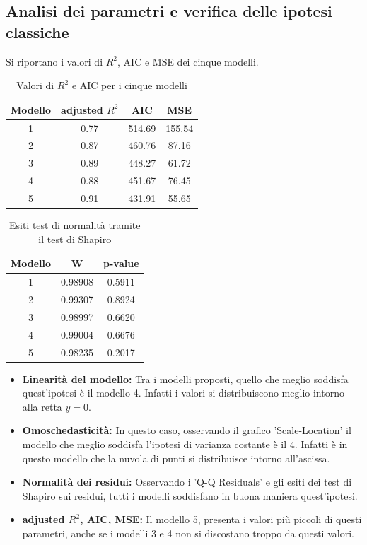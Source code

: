 \subsection{Analisi dei parametri e verifica delle ipotesi classiche}
Si riportano i valori di $R^2$, AIC e MSE dei cinque modelli.
\begin{table}[H]
	\centering
	\begin{tabular}{|c|c|c|c|}
		\hline
		\textbf{Modello} & \textbf{adjusted} \boldmath$R^2$ & \textbf{AIC} & \textbf{MSE}\\
		\hline
		1 &  0.77  & 514.69 & 155.54\\
		2 & 0.87 & 460.76 & 87.16\\
		3 & 0.89 & 448.27 & 61.72\\
		4 & 0.88 & 451.67 & 76.45\\
		5 & 0.91 & 431.91 & 55.65 \\
		\hline
	\end{tabular}
	\caption{Valori di $R^2$ e AIC per i cinque modelli}
\end{table}
\begin{table}[H]
	\centering
	\begin{tabular}{|c|c|c|}
		\hline
		\textbf{Modello} & \textbf{W} & \textbf{p-value} \\
		\hline
		1 & 0.98908 & 0.5911 \\
		2 & 0.99307 & 0.8924 \\
		3 & 0.98997 & 0.6620 \\
		4 & 0.99004 & 0.6676 \\
		5 & 0.98235 & 0.2017 \\
		\hline
	\end{tabular}
	\caption{Esiti test di normalità tramite il test di Shapiro}
	\label{tab:coef_estimates}
\end{table}
\begin{itemize}
	\item \textbf{Linearità del modello:} Tra i modelli proposti, quello che meglio soddisfa quest'ipotesi è il modello 4. Infatti i valori si distribuiscono meglio intorno alla retta $y=0$.
	\item \textbf{Omoschedasticità:} In questo caso, osservando il grafico 'Scale-Location' il modello che meglio soddisfa l'ipotesi di varianza costante è il 4. Infatti è in questo modello che la nuvola di punti si distribuisce intorno all'ascissa.
	\item \textbf{Normalità dei residui: } Osservando i 'Q-Q Residuals' e gli esiti dei test di Shapiro sui residui, tutti i modelli soddisfano in buona maniera quest'ipotesi.
	\item \textbf{adjusted $R^2$, AIC, MSE:} Il modello 5, presenta i valori più piccoli di questi parametri, anche se i modelli 3 e 4 non si discostano troppo da questi valori. 
\end{itemize}
